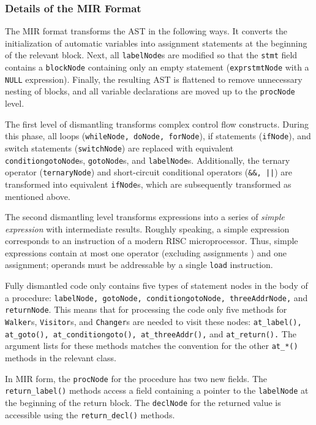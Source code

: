 \subsubsection{Details of the MIR Format}
\label{output:output}

The MIR format transforms the AST in the following ways.  It converts the
initialization of automatic variables into assignment statements at the
beginning of the relevant block.  Next, all \texttt{labelNode}s are modified
so that the \texttt{stmt} field contains a \texttt{blockNode} containing only
an empty statement (\texttt{exprstmtNode} with a \texttt{NULL} expression).
Finally, the resulting AST is flattened to remove unnecessary nesting of
blocks, and all variable declarations are moved up to the \texttt{procNode}
level.

The first level of dismantling transforms complex control flow constructs.
During this phase, all loops (\texttt{whileNode, doNode, forNode}), if
statements (\texttt{ifNode}), and switch statements (\texttt{switchNode}) are
replaced with equivalent \texttt{conditiongotoNode}s, \texttt{gotoNode}s, and
\texttt{labelNode}s.  Additionally, the ternary operator
(\texttt{ternaryNode}) and short-circuit conditional operators (\texttt{\&\&,
||}) are transformed into equivalent \texttt{ifNode}s, which are subsequently
transformed as mentioned above.

The second dismantling level transforms expressions into a series of
\emph{simple expression} with intermediate results.  Roughly speaking, a
simple expression corresponds to an instruction of a modern RISC
microprocessor.  Thus, simple expressions contain at most one operator
(excluding assignments ) and one assignment; operands must be addressable by
a single \texttt{load} instruction.

Fully dismantled code only contains five types of statement nodes in the body
of a procedure: \texttt{labelNode, gotoNode, conditiongotoNode,
threeAddrNode,} and \texttt{returnNode}.  This means that for processing the
code only five methods for \texttt{Walker}s, \texttt{Visitor}s, and
\texttt{Changer}s are needed to visit these nodes: \texttt{at\_label(),
at\_goto(), at\_conditiongoto(), at\_threeAddr(),} and
\texttt{at\_return().}  The argument lists for these methods matches the
convention for the other \texttt{at\_*()} methods in the relevant class.

In MIR form, the \texttt{procNode} for the procedure has two new fields.  The
\texttt{return\_label()} methods access a field containing a pointer to the
\texttt{labelNode} at the beginning of the return block.  The
\texttt{declNode} for the returned value is accessible using the
\texttt{return\_decl()} methods.



